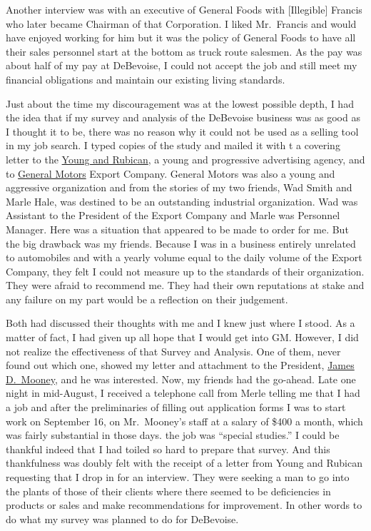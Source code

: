 \documentclass[12pt]{book}              %
\begin{document}
Another interview was with an executive of General Foods with [Illegible] Francis who later became Chairman of that Corporation. I liked Mr.~Francis and would have enjoyed working for him but it was the policy of General Foods to have all their sales personnel start at the bottom as truck route salesmen. As the pay was about half of my pay at DeBevoise, I could not accept the job and still meet my financial obligations and maintain our existing living standards.

Just about the time my discouragement was at the lowest possible depth, I had the idea that if my survey and analysis of the DeBevoise business was as good as I thought it to be, there was no reason why it could not be used as a selling tool in my job search. I typed copies of the study and mailed it with t a covering letter to the \href{http://en.wikipedia.org/wiki/Young_\%26_Rubicam}{Young and Rubican}, a young and progressive advertising agency, and to \href{http://en.wikipedia.org/wiki/General_Motors}{General Motors} Export Company. General Motors was also a young and aggressive organization and from the stories of my two friends, Wad Smith and Marle Hale, was destined to be an outstanding industrial organization. Wad was Assistant to the President of the Export Company and Marle was Personnel Manager. Here was a situation that appeared to be made to order for me. But the big drawback was my friends. Because I was in a business entirely unrelated to automobiles and with a yearly volume equal to the daily volume of the Export Company, they felt I could not measure up to the standards of their organization. They were afraid to recommend me. They had their own reputations at stake and any failure on my part would be a reflection on their judgement. 

Both had discussed their thoughts with me and I knew just where I stood. As a matter of fact, I had given up all hope that I would get into GM. However, I did not realize the effectiveness of that Survey and Analysis. One of them, never found out which one, showed my letter and attachment to the President, \href{http://en.wikipedia.org/wiki/James_D._Mooney}{James D.~Mooney}, and he was interested. Now, my friends had the go-ahead. Late one night in mid-August, I received a telephone call from Merle telling me that I had a job and after the preliminaries of filling out application forms I was to start work on September 16, on Mr.~Mooney's staff at a salary of \$400 a month, which was fairly substantial in those days. the job was ``special studies.'' I could be thankful indeed that I had toiled so hard to prepare that survey. And this thankfulness was doubly felt with the receipt of a letter from Young and Rubican requesting that I drop in for an interview. They were seeking a man to go into the plants of those of their clients where there seemed to be deficiencies in products or sales and make recommendations for improvement. In other words to do what my survey was planned to do for DeBevoise. 
\end{document}
